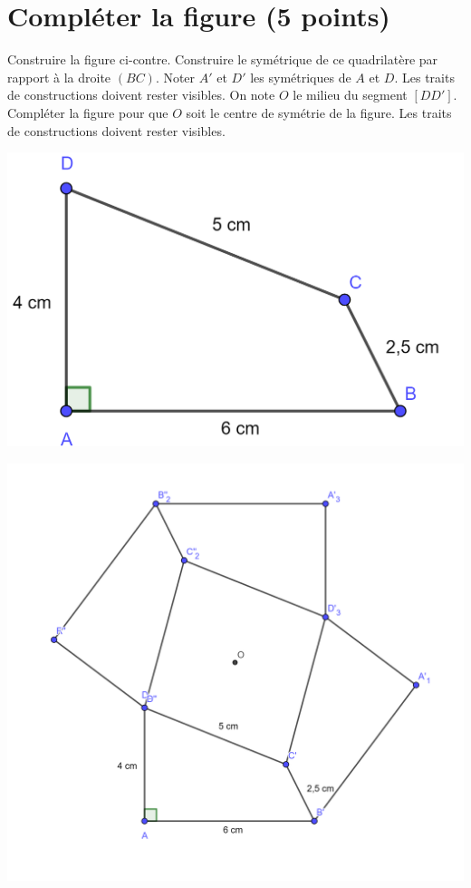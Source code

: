 \section{Compléter la figure (5 points)}

\begin{multicols}{2}
	\begin{questions}
		\question[1] Construire la figure ci-contre.
		\question[2] Construire le symétrique de ce quadrilatère par rapport à la droite $(BC)$. Noter $A'$ et $D'$ les symétriques de $A$ et $D$. Les traits de constructions doivent rester visibles.
		\question[2] On note $O$ le milieu du segment $[DD']$. Compléter la figure pour que $O$ soit le centre de symétrie de la figure. Les traits de constructions doivent rester visibles.


	\begin{center}
		\includegraphics[scale=0.25]{img/cons}
	\end{center}

	\begin{solution}
		\begin{center}
			\includegraphics[scale=0.15]{img/cons_corr}
		\end{center}		
	\end{solution}

	\end{questions}
\end{multicols}